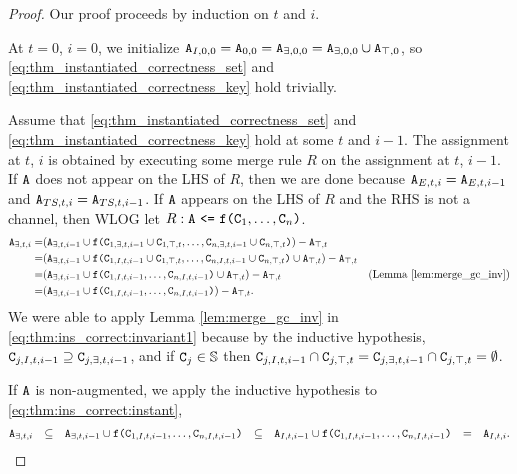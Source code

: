 \begin{proof}
Our proof proceeds by induction on $t$ and $i$.

At $t=0$, $i=0$, we initialize $\tt{A}_{I,0,0} = \tt{A}_{0,0} = \tt{A}_{\exists,0,0} = \tt{A}_{\exists,0,0} \cup \tt{A}_{\top,0}$, so \eqref{eq:thm_instantiated_correctness_set} and \eqref{eq:thm_instantiated_correctness_key} hold trivially.

Assume that \eqref{eq:thm_instantiated_correctness_set} and \eqref{eq:thm_instantiated_correctness_key} hold at some $t$ and $i-1$.
The assignment at $t$, $i$ is obtained by executing some merge rule $R$ on the assignment at $t$, $i-1$.
If $\tt{A}$ does not appear on the LHS of $R$, then we are done because $\tt{A}_{E,t,i} = \tt{A}_{E,t,i-1}$ and $\tt{A}_{TS,t,i} = \tt{A}_{TS,t,i-1}$.
If $\tt{A}$ appears on the LHS of $R$ and the RHS is not a channel, then WLOG let $R: \tt{A} ~\tt{<=}~ \tt{f}\tt{(}\tt{C}_1, \dots, \tt{C}_n\tt{)}$.
\begin{align}
\tt{A}_{\exists,t,i}
=& (\tt{A}_{\exists,t,i-1} \cup \tt{f}\tt{(}\tt{C}_{1,\exists,t,i-1} \cup \tt{C}_{1,\top,t}, \dots, \tt{C}_{n,\exists,t,i-1} \cup \tt{C}_{n,\top,t}\tt{)}) - \tt{A}_{\top,t}\nonumber\\
=& (\tt{A}_{\exists,t,i-1} \cup \tt{f}\tt{(}\tt{C}_{1,I,t,i-1} \cup \tt{C}_{1,\top,t}, \dots, \tt{C}_{n,I,t,i-1} \cup \tt{C}_{n,\top,t}\tt{)} \cup \tt{A}_{\top,t}) - \tt{A}_{\top,t}\nonumber\\
=& (\tt{A}_{\exists,t,i-1} \cup \tt{f}\tt{(}\tt{C}_{1,I,t,i-1}, \dots, \tt{C}_{n,I,t,i-1}\tt{)} \cup \tt{A}_{\top,t}) - \tt{A}_{\top,t} & \text{(Lemma \ref{lem:merge_gc_inv})} \label{eq:thm:ins_correct:invariant1}\\
=& (\tt{A}_{\exists,t,i-1} \cup \tt{f}\tt{(}\tt{C}_{1,I,t,i-1}, \dots, \tt{C}_{n,I,t,i-1}\tt{)}) - \tt{A}_{\top,t}.\label{eq:thm:ins_correct:instant}
\end{align}
We were able to apply Lemma \ref{lem:merge_gc_inv} in \eqref{eq:thm:ins_correct:invariant1} because by the inductive hypothesis, $\tt{C}_{j,I,t,i-1} \supseteq \tt{C}_{j,\exists,t,i-1}$, and if $\tt{C}_j \in \mathbb{S}$ then $\tt{C}_{j,I,t,i-1} \cap \tt{C}_{j,\top,t} = \tt{C}_{j,\exists,t,i-1} \cap \tt{C}_{j,\top,t} = \emptyset$.

If $\tt{A}$ is non-augmented, we apply the inductive hypothesis to \eqref{eq:thm:ins_correct:instant},
\begin{align*}
\tt{A}_{\exists,t,i}
&&\subseteq&& \tt{A}_{\exists,t,i-1} \cup \tt{f}\tt{(}\tt{C}_{1,I,t,i-1}, \dots, \tt{C}_{n,I,t,i-1}\tt{)}
&&\subseteq&& \tt{A}_{I,t,i-1} \cup \tt{f}\tt{(}\tt{C}_{1,I,t,i-1}, \dots, \tt{C}_{n,I,t,i-1}\tt{)}
&&=&& \tt{A}_{I,t,i}.
\end{align*}


\end{proof}
